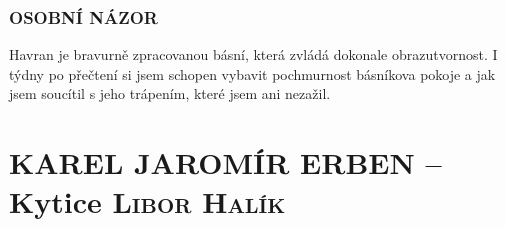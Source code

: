 \documentclass[A4paper]{extarticle} %
\begin{document}





\section*{OSOBNÍ NÁZOR}
\noindent 
Havran je bravurně zpracovanou básní, která zvládá dokonale obrazutvornost. I týdny po přečtení si jsem schopen vybavit pochmurnost básníkova pokoje a jak jsem soucítil s jeho trápením, které jsem ani nezažil.

\newpage


\changefontsize{7pt}

\part*{KAREL JAROMÍR ERBEN -- Kytice {\hfill \normalfont\tiny\textsc{Libor Halík}}}
\end{document}
